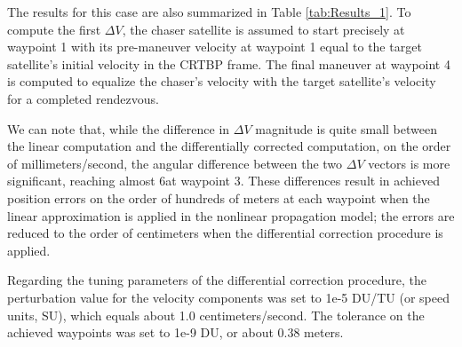 \documentclass[a4paper]{article}
\begin{document}
The results for this case are also summarized in Table \ref{tab:Results_1}.  To compute the first \(\Delta V\), the chaser satellite is assumed to start precisely at waypoint 1 with its pre-maneuver velocity at waypoint 1 equal to the target satellite's initial velocity in the CRTBP frame.  The final maneuver at waypoint 4 is computed to equalize the chaser's velocity with the target satellite's velocity for a completed rendezvous.

We can note that, while the difference in \(\Delta V\) magnitude is quite small between the linear computation and the differentially corrected computation, on the order of millimeters/second, the angular difference between the two \(\Delta V\) vectors is more significant, reaching almost 6\textdegree at waypoint 3.  These differences result in achieved position errors on the order of hundreds of meters at each waypoint when the linear approximation is applied in the nonlinear propagation model; the errors are reduced to the order of centimeters when the differential correction procedure is applied.

Regarding the tuning parameters of the differential correction procedure, the perturbation value for the velocity components was set to 1e-5 DU/TU (or speed units, SU), which equals about 1.0 centimeters/second.  The tolerance on the achieved waypoints was set to 1e-9 DU, or about 0.38 meters.  




\end{document}
